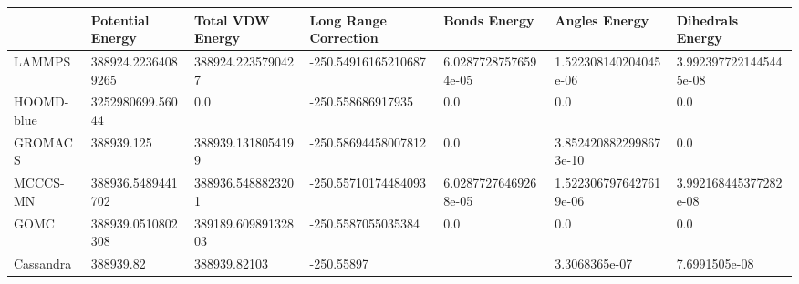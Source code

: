 \begin{table}[!ht]
    \centering
    \begin{tabular}{|l|l|l|l|l|l|l|}
    \hline
        ~ & Potential Energy & Total VDW Energy & Long Range Correction & Bonds Energy & Angles Energy & Dihedrals Energy \\ \hline
        LAMMPS & 388924.22364089265 & 388924.2235790427 & -250.54916165210687 & 6.02877287576594e-05 & 1.522308140204045e-06 & 3.9923977221445445e-08 \\ \hline
        HOOMD-blue & 3252980699.56044 & 0.0 & -250.558686917935 & 0.0 & 0.0 & 0.0 \\ \hline
        GROMACS & 388939.125 & 388939.1318054199 & -250.58694458007812 & 0.0 & 3.8524208822998673e-10 & 0.0 \\ \hline
        MCCCS-MN & 388936.5489441702 & 388936.5488823201 & -250.55710174484093 & 6.02877276469268e-05 & 1.5223067976427619e-06 & 3.992168445377282e-08 \\ \hline
        GOMC & 388939.0510802308 & 389189.60989132803 & -250.5587055035384 & 0.0 & 0.0 & 0.0 \\ \hline
        Cassandra & 388939.82 & 388939.82103 & -250.55897 & ~ & 3.3068365e-07 & 7.6991505e-08 \\ \hline
    \end{tabular}
\end{table}
